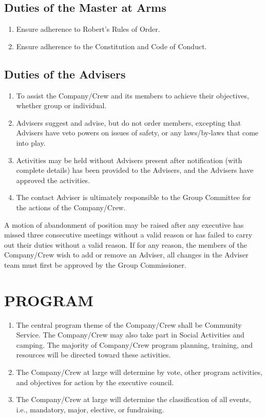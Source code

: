 \documentclass{Service_Corps_Document}
\begin{document}
\subsection{Duties of the Master at Arms}
\begin{enumerate}
	\item Ensure adherence to Robert's Rules of Order.
	\item Ensure adherence to the Constitution and Code of Conduct.
\end{enumerate}
\subsection{Duties of the Advisers}
\begin{enumerate}
	\item To assist the Company/Crew and its members to achieve their objectives, whether group or individual.
	\item Advisers suggest and advise, but do not order members, excepting that Advisers have veto powers on issues of safety, or any laws/by-laws that come into play.
	\item Activities may be held without Advisers present after notification (with complete details) has been provided to the Advisers, and the Advisers have approved the activities.
	\item The contact Adviser is ultimately responsible to the Group Committee for the actions of the Company/Crew. 
\end{enumerate}
A motion of abandonment of position may be raised after any executive has missed three consecutive meetings without a valid reason or has failed to carry out their duties without a valid reason. If for any reason, the members of the Company/Crew wish to add or remove an Adviser, all changes in the Adviser team must first be approved by the Group Commissioner. 
\section{PROGRAM}
\begin{enumerate}
	\item The central program theme of the Company/Crew shall be Community Service. The Company/Crew may also take part in Social Activities and camping. The majority of Company/Crew program planning, training, and resources will be directed toward these activities. 
	\item The Company/Crew at large will determine by vote, other program activities, and objectives for action by the executive council.
	\item The Company/Crew at large will determine the classification of all events, i.e., mandatory, major, elective, or fundraising.
\end{enumerate}
\end{document}
